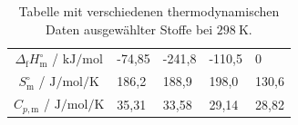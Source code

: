 \documentclass[../main.tex]{subfiles}
\begin{document}
\begin{table}[H]
    \caption{Tabelle mit verschiedenen thermodynamischen Daten ausgew\"ahlter Stoffe bei $\SI{298}{\kelvin}$.}
    \label{tab: 2025-10-3_therm. Daten2}
    \centering
    \begin{tabular}{cC{1.5cm}C{1.5cm}C{1.5cm}C{1.5cm}}
    \toprule
        &  &  &  & \\\midrule
        $\Delta_\mathrm{f}H^{\circ}_\mathrm{m}$ / $\si{\kilo\joule\per\mole}$ & -74,85 & -241,8 & -110,5 & 0\\
        $S^{\circ}_\mathrm{m}$ / $\si{\joule\per\mole\per\kelvin}$ & 186,2 & 188,9 & 198,0 & 130,6\\
        $C_{p, \mathrm{m}}$ / $\si{\joule\per\mole\per\kelvin}$ & 35,31 & 33,58 & 29,14 & 28,82\\\bottomrule
    \end{tabular}
\end{table}
\aufgabenende


\end{document}

